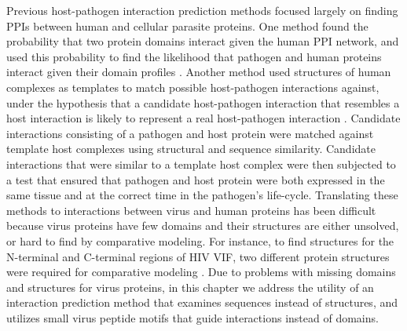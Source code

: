 Previous host-pathogen interaction prediction methods focused largely
on finding PPIs between human and cellular parasite proteins. One
method found the probability that two protein domains interact given
the human PPI network, and used this probability to find the
likelihood that pathogen and human proteins interact given their
domain profiles \cite{dyer07}. Another method used structures of human
complexes as templates to match possible host-pathogen interactions
against, under the hypothesis that a candidate host-pathogen
interaction that resembles a host interaction is likely to represent a
real host-pathogen interaction \cite{davis07}. Candidate interactions
consisting of a pathogen and host protein were matched against
template host complexes using structural and sequence
similarity. Candidate interactions that were similar to a template
host complex were then subjected to a test that ensured that pathogen
and host protein were both expressed in the same tissue and at the
correct time in the pathogen's life-cycle. Translating these methods
to interactions between virus and human proteins has been difficult
because virus proteins have few domains and their structures are
either unsolved, or hard to find by comparative modeling. For
instance, to find structures for the N-terminal and C-terminal regions
of HIV VIF, two different protein structures were required for
comparative modeling \cite{lv07}. Due to problems with missing domains
and structures for virus proteins, in this chapter we address the
utility of an interaction prediction method that examines sequences
instead of structures, and utilizes small virus peptide motifs that
guide interactions instead of domains.

